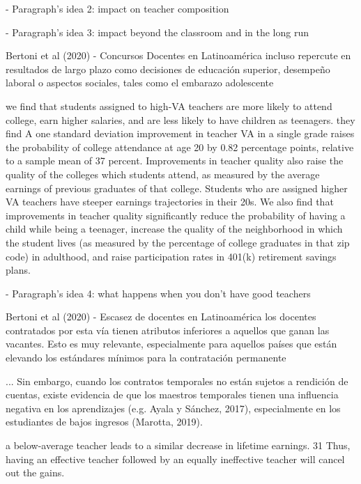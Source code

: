 - Paragraph's idea 2: impact on teacher composition





- Paragraph's idea 3: impact beyond the classroom and in the long run

Bertoni et al (2020) - Concursos Docentes en Latinoamérica
incluso repercute en resultados de largo plazo como decisiones de educación superior, desempeño laboral o aspectos sociales, tales como el embarazo adolescente 

we find that students assigned to high-VA teachers are more likely to attend college, earn higher salaries, and are less likely to have children as teenagers. they find A one standard deviation improvement in teacher VA in a single grade raises the probability of college attendance at age 20 by 0.82 percentage points, relative to a sample mean of 37 percent. Improvements in teacher quality also raise the quality of the colleges which students attend, as measured by the average earnings of previous graduates of that college. Students who are assigned higher VA teachers have steeper earnings trajectories in their 20s. We also find that improvements in teacher quality significantly reduce the probability of having a child while being a teenager, increase the quality of the neighborhood in which the student lives (as measured by the percentage of college graduates in that zip code) in adulthood, and raise participation rates in 401(k) retirement savings plans.
\citep{Chetty_et_al_2014b}



- Paragraph's idea 4: what happens when you don't have good teachers

Bertoni et al (2020) - Escasez de docentes en Latinoamérica
los docentes contratados por esta vía tienen atributos inferiores a aquellos que ganan las vacantes. Esto es muy relevante, especialmente para aquellos países que están elevando los estándares mínimos para la contratación permanente

... Sin embargo, cuando los contratos temporales no están sujetos a rendición de cuentas, existe evidencia de que los maestros temporales tienen una influencia negativa en los aprendizajes (e.g. Ayala y Sánchez, 2017), especialmente en los estudiantes de bajos ingresos (Marotta, 2019).

a below-average teacher leads to a similar decrease in lifetime earnings. 31 Thus, having an effective teacher followed by an equally ineffective teacher will cancel out the gains. \citep{Hanushek_et_al_2012}

